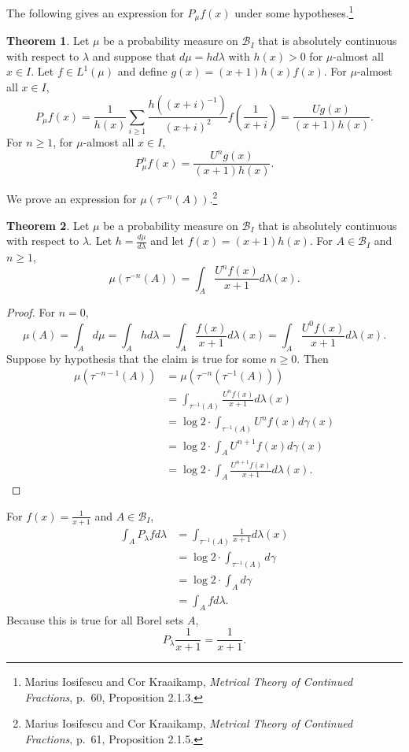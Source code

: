 \documentclass{article}
\theoremstyle{definition}
\newtheorem{theorem}{Theorem}
\theoremstyle{definition}
\begin{document}
The following gives an expression for $P_\mu f(x)$ under some hypotheses.\footnote{Marius Iosifescu and Cor Kraaikamp,
{\em Metrical Theory of Continued Fractions}, p.~60, Proposition 2.1.3.}

\begin{theorem}
Let $\mu$ be a probability measure on $\mathscr{B}_I$ that is absolutely continuous with respect
to $\lambda$ and suppose that $d\mu = h d\lambda$ with $h(x)>0$ for $\mu$-almost all $x \in I$. Let
$f \in L^1(\mu)$ and define $g(x)=(x+1)h(x)f(x)$. 
For $\mu$-almost all $x \in I$,
\[
P_\mu f(x) = \frac{1}{h(x)} \sum_{i \geq 1} \frac{h((x+i)^{-1})}{(x+i)^2} f\left(\frac{1}{x+i}\right)
=\frac{Ug(x)}{(x+1)h(x)}.
\]
For $n \geq 1$, for $\mu$-almost all $x \in I$,
\[
P_\mu^n f(x) = \frac{U^n g(x)}{(x+1)h(x)}.
\]
\label{Pmu}
\end{theorem}



We prove an expression for $\mu(\tau^{-n}(A))$.\footnote{Marius Iosifescu and Cor Kraaikamp,
{\em Metrical Theory of Continued Fractions}, p.~61, Proposition 2.1.5.}

\begin{theorem}
Let $\mu$ be a probability measure on $\mathscr{B}_I$ that is absolutely continuous with respect
to $\lambda$. Let $h = \frac{d\mu}{d\lambda}$ and let $f(x)=(x+1)h(x)$. For $A \in \mathscr{B}_I$
and $n \geq 1$,
\[
\mu(\tau^{-n}(A)) = \int_A \frac{U^n f(x)}{x+1} d\lambda(x).
\]
\end{theorem}
\begin{proof}
For $n=0$, 
\[
\mu(A) =  \int_A d\mu = 
 \int_A h d\lambda =
\int_A \frac{f(x)}{x+1} d\lambda(x)=\int_A \frac{U^0 f(x)}{x+1} d\lambda(x).
\]
Suppose by hypothesis that the claim is true for some $n \geq 0$.
Then 
\begin{align*}
\mu(\tau^{-n-1}(A))&=\mu(\tau^{-n}(\tau^{-1}(A)))\\
&=\int_{\tau^{-1}(A)} \frac{U^n f(x)}{x+1} d\lambda(x)\\
&=\log 2\cdot \int_{\tau^{-1}(A)} U^n f(x) d\gamma(x)\\
&=\log 2\cdot \int_A U^{n+1}f(x) d\gamma(x)\\
&=\log 2\cdot \int_A \frac{U^{n+1} f(x)}{x+1} d\lambda(x).
\end{align*}
\end{proof}


For $f(x)=\frac{1}{x+1}$ and $A \in \mathscr{B}_I$,
\begin{align*}
\int_A P_\lambda f d\lambda&=\int_{\tau^{-1}(A)} \frac{1}{x+1} d\lambda(x)\\
&=\log 2 \cdot \int_{\tau^{-1}(A)} d\gamma\\
&=\log 2 \cdot \int_A d\gamma\\
&= \int_A f d\lambda.
\end{align*}
Because this is true for all Borel sets $A$,
\[
P_\lambda \frac{1}{x+1} = \frac{1}{x+1}.
\]
\end{document}
